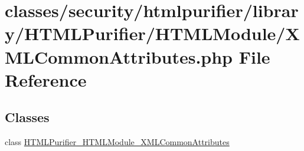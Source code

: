 \hypertarget{XMLCommonAttributes_8php}{\section{classes/security/htmlpurifier/library/\+H\+T\+M\+L\+Purifier/\+H\+T\+M\+L\+Module/\+X\+M\+L\+Common\+Attributes.php File Reference}
\label{XMLCommonAttributes_8php}
}
\subsection*{Classes}
\begin{DoxyCompactItemize}
\item 
class \hyperlink{classHTMLPurifier__HTMLModule__XMLCommonAttributes}{H\+T\+M\+L\+Purifier\+\_\+\+H\+T\+M\+L\+Module\+\_\+\+X\+M\+L\+Common\+Attributes}
\end{DoxyCompactItemize}

